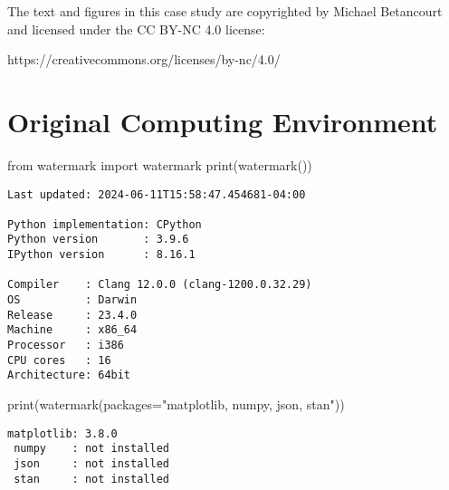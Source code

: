 \documentclass[
  letterpaper,
  DIV=11,
  numbers=noendperiod]{scrartcl}
\newenvironment{Shaded}{\begin{snugshade}}{\end{snugshade}}
\newcommand{\BuiltInTok}[1]{\textcolor[rgb]{0.00,0.23,0.31}{#1}}
\newcommand{\ImportTok}[1]{\textcolor[rgb]{0.00,0.46,0.62}{#1}}
\newcommand{\NormalTok}[1]{\textcolor[rgb]{0.00,0.23,0.31}{#1}}
\newcommand{\OperatorTok}[1]{\textcolor[rgb]{0.37,0.37,0.37}{#1}}
\newcommand{\StringTok}[1]{\textcolor[rgb]{0.13,0.47,0.30}{#1}}
\begin{document}
The text and figures in this case study are copyrighted by Michael
Betancourt and licensed under the CC BY-NC 4.0 license:

https://creativecommons.org/licenses/by-nc/4.0/

\section*{Original Computing
Environment}\label{original-computing-environment}

\begin{Shaded}
\begin{Highlighting}[]
\ImportTok{from}\NormalTok{ watermark }\ImportTok{import}\NormalTok{ watermark}
\BuiltInTok{print}\NormalTok{(watermark())}
\end{Highlighting}
\end{Shaded}

\begin{verbatim}
Last updated: 2024-06-11T15:58:47.454681-04:00

Python implementation: CPython
Python version       : 3.9.6
IPython version      : 8.16.1

Compiler    : Clang 12.0.0 (clang-1200.0.32.29)
OS          : Darwin
Release     : 23.4.0
Machine     : x86_64
Processor   : i386
CPU cores   : 16
Architecture: 64bit
\end{verbatim}

\begin{Shaded}
\begin{Highlighting}[]
\BuiltInTok{print}\NormalTok{(watermark(packages}\OperatorTok{=}\StringTok{"matplotlib, numpy, json, stan"}\NormalTok{))}
\end{Highlighting}
\end{Shaded}

\begin{verbatim}
matplotlib: 3.8.0
 numpy    : not installed
 json     : not installed
 stan     : not installed
\end{verbatim}
\end{document}
